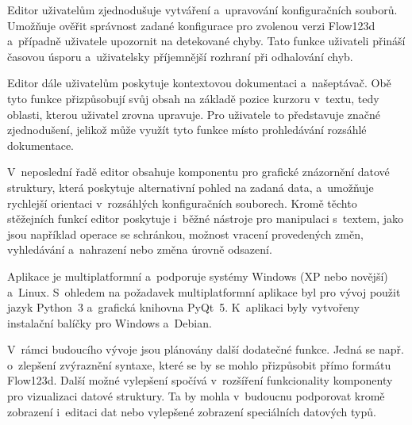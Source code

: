 \documentclass[FM,bw,DP]{tulthesis}
\begin{document}
Editor uživatelům zjednodušuje vytváření a~upravování konfiguračních souborů. Umožňuje ověřit správnost zadané konfigurace pro zvolenou verzi Flow123d a~případně uživatele upozornit na detekované chyby. Tato funkce uživateli přináší časovou úsporu a~uživatelsky příjemnější rozhraní při odhalování chyb.

Editor dále uživatelům poskytuje kontextovou dokumentaci a~našeptávač. Obě tyto funkce přizpůsobují svůj obsah na základě pozice kurzoru v~textu, tedy oblasti, kterou uživatel zrovna upravuje. Pro uživatele to představuje značné zjednodušení, jelikož může využít tyto funkce místo prohledávání rozsáhlé dokumentace.

V~neposlední řadě editor obsahuje komponentu pro grafické znázornění datové struktury, která poskytuje alternativní pohled na zadaná data, a~umožňuje rychlejší orientaci v~rozsáhlých konfiguračních souborech. Kromě těchto stěžejních funkcí editor poskytuje i~běžné nástroje pro manipulaci s~textem, jako jsou například operace se schránkou, možnost vracení provedených změn, vyhledávání a~nahrazení nebo změna úrovně odsazení.

Aplikace je multiplatformní a~podporuje systémy Windows (XP nebo novější) a~Linux. S~ohledem na požadavek multiplatformní aplikace byl pro vývoj použit jazyk Python~3 a~grafická knihovna PyQt~5. K~aplikaci byly vytvořeny instalační balíčky pro Windows a~Debian.

V~rámci budoucího vývoje jsou plánovány další dodatečné funkce. Jedná se např. o~zlepšení zvýraznění syntaxe, které se by se mohlo přizpůsobit přímo formátu Flow123d. Další možné vylepšení spočívá v~rozšíření funkcionality komponenty pro vizualizaci datové struktury. Ta by mohla v~budoucnu podporovat kromě zobrazení i~editaci dat nebo vylepšené zobrazení speciálních datových typů.
\end{document}

